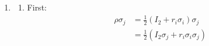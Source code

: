 \documentclass[12pt,a4]{article}
\begin{document}
\begin{enumerate}
\begin{enumerate}
\begin{align*}
{\begin{matrix}
                       0 & 0 & 0 & 1
                     \end{matrix}
                    \right)
                  }\\
          &= \tr \sqrt{
                    \frac{1}{16} 
                    \left(
                     \begin{matrix}
                       1 & 0 & 0 & 0\\
                       0 & 1 & 0 & 0\\
                       0 & 0 & 1 & 0\\
                       0 & 0 & 0 & 1
                     \end{matrix}
                    \right)
                    \left(
                     \begin{matrix}
                       1 & 0 & 0 & 0\\
                       0 & 1 & 0 & 0\\
                       0 & 0 & 1 & 0\\
                       0 & 0 & 0 & 1
                     \end{matrix}
                    \right)
                  }\\
          &= \frac{1}{4}\tr \sqrt{
                    \left(
                     \begin{matrix}
                       1 & 0 & 0 & 0\\
                       0 & 1 & 0 & 0\\
                       0 & 0 & 1 & 0\\
                       0 & 0 & 0 & 1
                     \end{matrix}
                    \right)
                  }\\
          &= 1
        \end{align*}
        And hence: 
        \begin{align*}
          \mathcal{N} [\rho] = \frac{1 - 1}{2} = 0
        \end{align*}
    \end{enumerate}
  \item
    \begin{enumerate}
      \item
        First:
        \begin{align*}
          \rho \sigma_j &= \frac{1}{2}\left(I_2 + r_i \sigma_i\right) \sigma_j\\
                        &= \frac{1}{2}\left(I_2 \sigma_j + r_i \sigma_i\sigma_j\right)\\ 

\end{align*}
\end{enumerate}
\end{enumerate}
\end{document}
